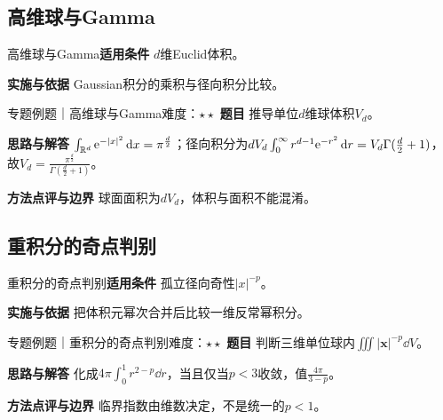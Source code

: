 \subsection{高维球与Gamma}\label{mat:multiple:nball}
\begin{method}{高维球与Gamma}\textbf{适用条件} $d$维Euclid体积。\par\textbf{实施与依据} Gaussian积分的乘积与径向积分比较。\end{method}
\begin{example}{专题例题｜高维球与Gamma}{难度：$\star\star$}
\textbf{题目} 推导单位$d$维球体积$V_d$。\par\textbf{思路与解答} $\int_{\mathbb{R}^d}\mathrm{e}^{-|x|^2}\mathop{}\!\mathrm{d} x=\pi^{\frac{d}{2}}$；径向积分为$dV_d\int_0^\infty r^{d-1}\mathrm{e}^{-r^2}\mathop{}\!\mathrm{d} r=V_d\Gamma(\frac{d}{2}+1)$，故$V_d=\frac{\pi^{\frac{d}{2}}}{\Gamma(\frac{d}{2}+1)}$。\par\textbf{方法点评与边界} 球面面积为$dV_d$，体积与面积不能混淆。
\end{example}
\subsection{重积分的奇点判别}\label{mat:multiple:singular}
\begin{method}{重积分的奇点判别}\textbf{适用条件} 孤立径向奇性$|x|^{-p}$。\par\textbf{实施与依据} 把体积元幂次合并后比较一维反常幂积分。\end{method}
\begin{example}{专题例题｜重积分的奇点判别}{难度：$\star\star$}
\textbf{题目} 判断三维单位球内$\iiint|\bm x|^{-p}\dd V$。\par\textbf{思路与解答} 化成$4\pi\int_0^1r^{2-p}\dd r$，当且仅当$p<3$收敛，值$\frac{4\pi}{3-p}$。\par\textbf{方法点评与边界} 临界指数由维数决定，不是统一的$p<1$。
\end{example}
